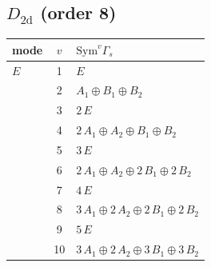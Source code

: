 \documentclass[11pt]{article}
\begin{document}
\subsection*{$D_{2\mathrm{d}}$ \quad (order 8)}
\begin{longtable}{l c p{}}
\hline mode & $v$ & $\mathrm{Sym}^v\Gamma_s$\\ \hline\endhead
$E$ & 1 & $E$\\
 & 2 & $A_{1}\oplus B_{1}\oplus B_{2}$\\
 & 3 & $2\,E$\\
 & 4 & $2\,A_{1}\oplus A_{2}\oplus B_{1}\oplus B_{2}$\\
 & 5 & $3\,E$\\
 & 6 & $2\,A_{1}\oplus A_{2}\oplus 2\,B_{1}\oplus 2\,B_{2}$\\
 & 7 & $4\,E$\\
 & 8 & $3\,A_{1}\oplus 2\,A_{2}\oplus 2\,B_{1}\oplus 2\,B_{2}$\\
 & 9 & $5\,E$\\
 & 10 & $3\,A_{1}\oplus 2\,A_{2}\oplus 3\,B_{1}\oplus 3\,B_{2}$\\
\hline
\end{longtable}
\end{document}
